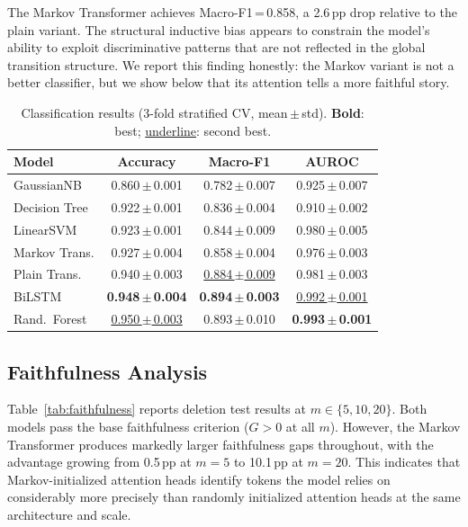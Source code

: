 \documentclass[12pt]{article}
\begin{document}
The Markov Transformer achieves Macro-F1\,=\,0.858, a 2.6\,pp drop
relative to the plain variant. The structural inductive bias appears
to constrain the model's ability to exploit discriminative patterns
that are not reflected in the global transition structure. We report
this finding honestly: the Markov variant is not a better classifier,
but we show below that its attention tells a more faithful story.

\begin{table}[t]
\centering
\caption{Classification results (3-fold stratified CV, mean\,$\pm$\,std).
  \textbf{Bold}: best; \underline{underline}: second best.}
\label{tab:classification}
\begin{tabular}{lccc}
\toprule
\textbf{Model} & \textbf{Accuracy} & \textbf{Macro-F1} & \textbf{AUROC} \\
\midrule
GaussianNB     & 0.860\,$\pm$\,0.001 & 0.782\,$\pm$\,0.007 & 0.925\,$\pm$\,0.007 \\
Decision Tree  & 0.922\,$\pm$\,0.001 & 0.836\,$\pm$\,0.004 & 0.910\,$\pm$\,0.002 \\
LinearSVM      & 0.923\,$\pm$\,0.001 & 0.844\,$\pm$\,0.009 & 0.980\,$\pm$\,0.005 \\
Markov Trans.  & 0.927\,$\pm$\,0.004 & 0.858\,$\pm$\,0.004 & 0.976\,$\pm$\,0.003 \\
Plain Trans.   & 0.940\,$\pm$\,0.003 & \underline{0.884\,$\pm$\,0.009} & 0.981\,$\pm$\,0.003 \\
BiLSTM         & \textbf{0.948\,$\pm$\,0.004} & \textbf{0.894\,$\pm$\,0.003} & \underline{0.992\,$\pm$\,0.001} \\
Rand.\ Forest  & \underline{0.950\,$\pm$\,0.003} & 0.893\,$\pm$\,0.010 & \textbf{0.993\,$\pm$\,0.001} \\
\bottomrule
\end{tabular}
\end{table}

\subsection{Faithfulness Analysis}
\label{sec:faithfulness}

Table~\ref{tab:faithfulness} reports deletion test results at
$m \in \{5, 10, 20\}$. Both models pass the base faithfulness
criterion ($G > 0$ at all $m$). However, the Markov Transformer
produces markedly larger faithfulness gaps throughout, with the
advantage growing from 0.5\,pp at $m{=}5$ to 10.1\,pp at $m{=}20$.
This indicates that Markov-initialized attention heads identify tokens
the model relies on considerably more precisely than randomly initialized
attention heads at the same architecture and scale.
\end{document}
